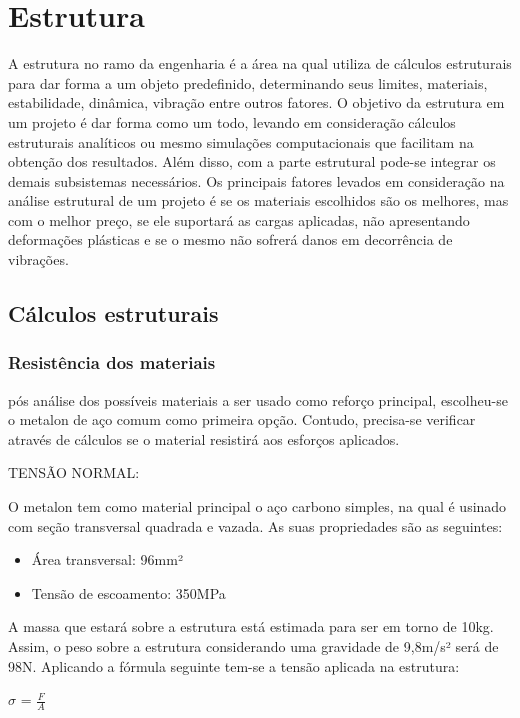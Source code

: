 \section{Estrutura}
A estrutura no ramo da engenharia é a área na qual utiliza de cálculos estruturais para dar forma a um objeto predefinido, determinando seus limites, materiais, estabilidade, dinâmica, vibração entre outros fatores. O objetivo da estrutura em um projeto é dar forma como um todo, levando em consideração cálculos estruturais analíticos ou mesmo simulações computacionais que facilitam na obtenção dos resultados. Além disso, com a parte estrutural pode-se integrar os demais subsistemas necessários.
Os principais fatores levados em consideração na análise estrutural de um projeto é se os materiais escolhidos são os melhores, mas com o melhor preço, se ele suportará as cargas aplicadas, não apresentando deformações plásticas e se o mesmo não sofrerá danos em decorrência de vibrações.

\subsection{Cálculos estruturais}

\subsubsection{Resistência dos materiais}

pós análise dos possíveis materiais a ser usado como reforço principal, escolheu-se o metalon de aço comum como primeira opção. Contudo, precisa-se verificar através de cálculos se o material resistirá aos esforços aplicados.


TENSÃO NORMAL:

O metalon tem como material principal o aço carbono simples, na qual é usinado com seção transversal quadrada e vazada. As suas propriedades são as seguintes:

\begin{itemize}
	\item Área transversal: 96mm²
	\item Tensão de escoamento: 350MPa
\end{itemize}

A massa que estará sobre a estrutura está estimada para ser em torno de 10kg. Assim, o peso sobre a estrutura considerando uma gravidade de 9,8m/s² será de 98N. Aplicando a fórmula seguinte tem-se a tensão aplicada na estrutura:

$\sigma$ = $\frac{F}{A}$

